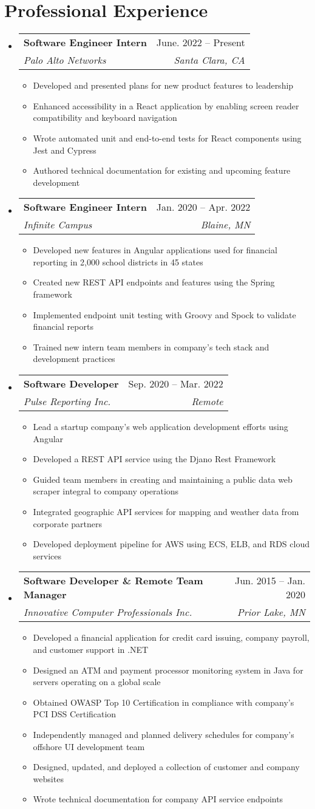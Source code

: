 \documentclass[letterpaper,11pt]{article}
\makeatletter
\newcommand{\resumeItem}[1]{\item\small{{#1 \vspace{-2pt}}}}
\newcommand{\resumeSection}[2]{\section{#1}\begin{itemize}[leftmargin=0.15in, label={}]#2\end{itemize}}
\newcommand{\resumeItemHeading}[4]{\vspace{-2pt}\item{\begin{tabular*}{0.97\textwidth}[t]{l@{\extracolsep{\fill}}r}\textbf{#1} & #2\\\textit{\small#3} & \textit{\small #4}\\\end{tabular*}\vspace{-7pt}}}
\newcommand{\resumeItemList}[1]{\begin{itemize}#1\end{itemize}\vspace{-5pt}}
\makeatother
\begin{document}
\resumeSection{Professional Experience}{
	\resumeItemHeading{Software Engineer Intern}{June. 2022 -- Present}{Palo Alto Networks}{Santa Clara, CA}
	\resumeItemList{
		\resumeItem{Developed and presented plans for new product features to leadership}
		\resumeItem{Enhanced accessibility in a React application by enabling screen reader compatibility and keyboard navigation}
		\resumeItem{Wrote automated unit and end-to-end tests for React components using Jest and Cypress}
		\resumeItem{Authored technical documentation for existing and upcoming feature development}
	}

	\resumeItemHeading{Software Engineer Intern}{Jan. 2020 -- Apr. 2022}{Infinite Campus}{Blaine, MN}
	\resumeItemList{
		\resumeItem{Developed new features in Angular applications used for financial reporting in 2,000 school districts in 45 states}
		\resumeItem{Created new REST API endpoints and features using the Spring framework}
		\resumeItem{Implemented endpoint unit testing with Groovy and Spock to validate financial reports}
		\resumeItem{Trained new intern team members in company's tech stack and development practices}
	}

	\resumeItemHeading{Software Developer}{Sep. 2020 -- Mar. 2022}{Pulse Reporting Inc.}{Remote}
	\resumeItemList{
		\resumeItem{Lead a startup company's web application development efforts using Angular}
		\resumeItem{Developed a REST API service using the Djano Rest Framework}
		\resumeItem{Guided team members in creating and maintaining a public data web scraper integral to company operations}
		\resumeItem{Integrated geographic API services for mapping and weather data from corporate partners}
		\resumeItem{Developed deployment pipeline for AWS using ECS, ELB, and RDS cloud services}
	}

	\resumeItemHeading{Software Developer \& Remote Team Manager}{Jun. 2015 -- Jan. 2020}{Innovative Computer Professionals Inc.}{Prior Lake, MN}
	\resumeItemList{
		\resumeItem{Developed a financial application for credit card issuing, company payroll, and customer support in .NET}
		\resumeItem{Designed an ATM and payment processor monitoring system in Java for servers operating on a global scale}
		\resumeItem{Obtained OWASP Top 10 Certification in compliance with company’s PCI DSS Certification}
		\resumeItem{Independently managed and planned delivery schedules for company’s offshore UI development team}
		\resumeItem{Designed, updated, and deployed a collection of customer and company websites}
		\resumeItem{Wrote technical documentation for company API service endpoints}
	}
}
\end{document}
